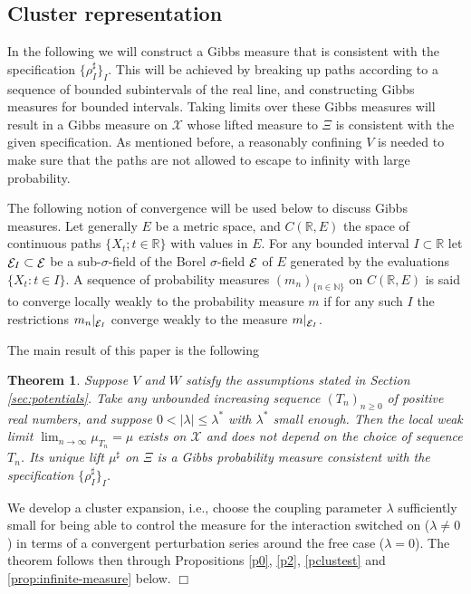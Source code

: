 \documentclass[a4paper,11pt]{article}
\newtheorem{theorem}{Theorem}[section]
\newenvironment{proof}[1][Proof]{{\sc #1.} }{\hfill $\Box$}
\newcommand{\R}{\mathbb{R}}
\newcommand{\E}{\mathop{\mathrm{{\cal E}}}\nolimits}
\newcommand{\X}{\mathcal{X}}
\begin{document}
\subsection{Cluster representation}
\label{sec:cluster-rep}

In the following we will construct a Gibbs measure that is consistent
with the specification $\{\rho^\sharp_I\}_I$. This will be achieved 
by breaking up paths according to a sequence of bounded subintervals 
of the real line, and constructing Gibbs measures for bounded intervals. 
Taking limits over these Gibbs measures will result in a Gibbs measure 
on $\X$ whose lifted measure to $\Xi$ is consistent with the given
specification. As mentioned before, a reasonably confining $V$ is 
needed to make sure that the paths are not allowed to escape to 
infinity with large probability. 

The following notion of convergence will be used below to discuss
Gibbs measures. Let generally $E$ 
be a metric space, and $C(\R,E)$ the space of continuous paths
$\{X_t; t \in \R\}$ with values in $E$. For any bounded interval $I  
\subset \R$ let $\E_I \subset \E$ be a sub-$\sigma$-field of the Borel 
$\sigma$-field $\E$ of $E$ generated by the evaluations $\{X_t: t \in I\}$. 
A sequence of probability measures $(m_n)_{\{n \in \mathbb{N}\}}$ on 
$C(\R,E)$ is said to converge locally weakly to the probability measure 
$m$ if for any such $I$ the restrictions $m_n|_{\E_I}$ converge weakly 
to the measure $m|_{\E_I}$. 

The main result of this paper is the following

\begin{theorem}
Suppose $V$ and $W$ satisfy the assumptions stated in Section 
\ref{sec:potentials}. Take any unbounded increasing sequence 
$(T_n)_{n\geq 0}$ of positive real numbers, and suppose $0 < |\lambda| 
\leq \lambda^*$ with $\lambda^*$ small enough. Then  the local weak 
limit $\lim_{n \rightarrow \infty} \mu_{T_n} = \mu$ exists on $\X$ 
and does not depend on the choice of sequence $T_n$. Its unique lift 
$\mu^\sharp$ on $\Xi$ is a Gibbs probability measure consistent with
the specification  $\{\rho^\sharp_I\}_I$.
\label{exist}
\end{theorem}
\begin{proof}
We develop a cluster expansion, i.e., choose the coupling parameter 
$\lambda$ sufficiently small for being able to control the measure 
for the interaction switched on ($\lambda \neq 0$) in terms of a 
convergent perturbation series around the free case ($\lambda = 0$).  
The theorem follows then through Propositions \ref{p0}, \ref{p2},
\ref{pclustest} and \ref{prop:infinite-measure} below. 
\end{proof}
\end{document}
